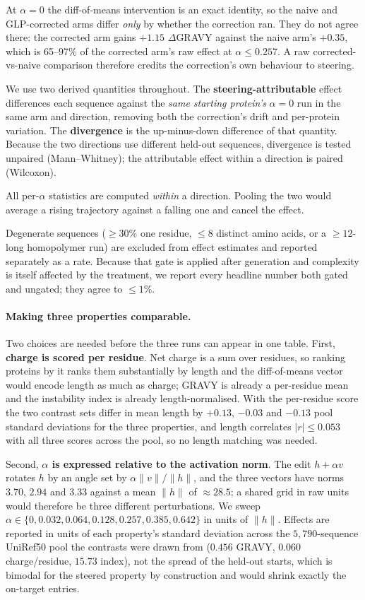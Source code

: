 \documentclass{article}
\begin{document}
At $\alpha{=}0$ the diff-of-means intervention is an exact identity, so the naive and
GLP-corrected arms differ \emph{only} by whether the correction ran. They do not agree
there: the corrected arm gains $+1.15$ $\Delta$GRAVY against the naive arm's $+0.35$, which
is 65--97\% of the corrected arm's raw effect at $\alpha \le 0.257$. A raw corrected-vs-naive
comparison therefore credits the correction's own behaviour to steering.

We use two derived quantities throughout. The \textbf{steering-attributable} effect
differences each sequence against the \emph{same starting protein's} $\alpha{=}0$ run in
the same arm and direction, removing both the correction's drift and per-protein variation.
The \textbf{divergence} is the up-minus-down difference of that quantity. Because the two
directions use different held-out sequences, divergence is tested unpaired
(Mann--Whitney); the attributable effect within a direction is paired (Wilcoxon).

All per-$\alpha$ statistics are computed \emph{within} a direction. Pooling the two would
average a rising trajectory against a falling one and cancel the effect.

Degenerate sequences (${\ge}30\%$ one residue, ${\le}8$ distinct amino acids, or a
${\ge}12$-long homopolymer run) are excluded from effect estimates and reported separately
as a rate. Because that gate is applied after generation and complexity is itself affected
by the treatment, we report every headline number both gated and ungated; they agree to
${\le}1\%$.

\paragraph{Making three properties comparable.} Two choices are needed before the three
runs can appear in one table. First, \textbf{charge is scored per residue}. Net charge is a
sum over residues, so ranking proteins by it ranks them substantially by length and the
diff-of-means vector would encode length as much as charge; GRAVY is already a per-residue
mean and the instability index is already length-normalised. With the per-residue score the
two contrast sets differ in mean length by $+0.13$, $-0.03$ and $-0.13$ pool standard
deviations for the three properties, and length correlates $|r|{\le}0.053$ with all three
scores across the pool, so no length matching was needed.

Second, \textbf{$\alpha$ is expressed relative to the activation norm}. The edit
$h + \alpha v$ rotates $h$ by an angle set by $\alpha\lVert v\rVert/\lVert h\rVert$, and the
three vectors have norms $3.70$, $2.94$ and $3.33$ against a mean $\lVert h\rVert$ of
$\approx\!28.5$; a shared grid in raw units would therefore be three different
perturbations. We sweep $\alpha \in \{0, 0.032, 0.064, 0.128, 0.257, 0.385, 0.642\}$ in
units of $\lVert h\rVert$. Effects are reported in units of each property's standard
deviation across the $5{,}790$-sequence UniRef50 pool the contrasts were drawn from
($0.456$ GRAVY, $0.060$ charge/residue, $15.73$ index), not the spread of the held-out
starts, which is bimodal for the steered property by construction and would shrink exactly
the on-target entries.
\end{document}

